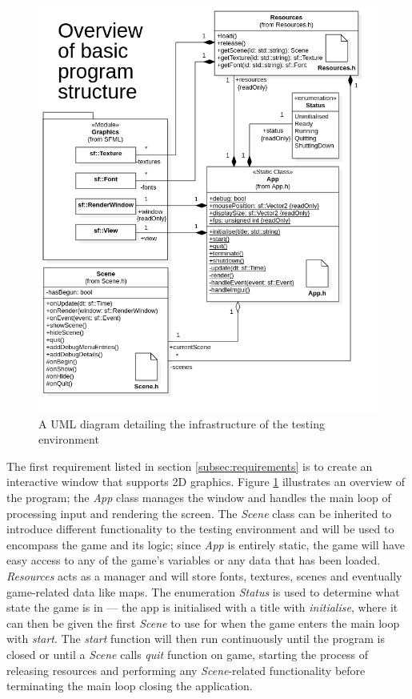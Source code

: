 \documentclass[11pt, a4paper]{report}
\begin{document}
\begin{figure}[!h]
  \centering
  \includegraphics[width=\linewidth]{img/app_overview.png}
  \caption{A UML diagram detailing the infrastructure of the testing environment}
  \label{fig:foundationsUML}
\end{figure}

The first requirement listed in section \ref{subsec:requirements} is to create an interactive window that supports 2D graphics. Figure \ref{fig:foundationsUML} illustrates an overview of the program; the \emph{App} class manages the window and handles the main loop of processing input and rendering the screen. The \emph{Scene} class can be inherited to introduce different functionality to the testing environment and will be used to encompass the game and its logic; since \emph{App} is entirely static, the game will have easy access to any of the game's variables or any data that has been loaded. \emph{Resources} acts as a manager and will store fonts, textures, scenes and eventually game-related data like maps. The enumeration \emph{Status} is used to determine what state the game is in --- the app is initialised with a title with \emph{initialise}, where it can then be given the first \emph{Scene} to use for when the game enters the main loop with \emph{start}. The \emph{start} function will then run continuously until the program is closed or until a \emph{Scene} calls \emph{quit} function on game, starting the process of releasing resources and performing any \emph{Scene}-related functionality before terminating the main loop closing the application.
\end{document}
